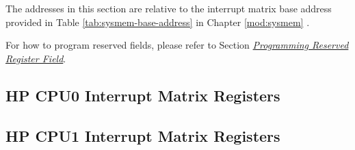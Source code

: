 \documentclass[main\_\_EN.tex]{subfiles}
\begin{document}
The addresses in this section are relative to the interrupt matrix base address provided in Table \ref{tab:sysmem-base-address} in Chapter \ref{mod:sysmem} \textit{}.

For how to program reserved fields, please refer to Section \hyperref[programming-reserved-field]{\textit{Programming Reserved Register Field}}.

\subsection{HP CPU0 Interrupt Matrix Registers}
\label{sec: cpu0-intmtrx-reg}



\subsection{HP CPU1 Interrupt Matrix Registers}
\label{sec: cpu1-intmtrx-reg}

\end{document}
